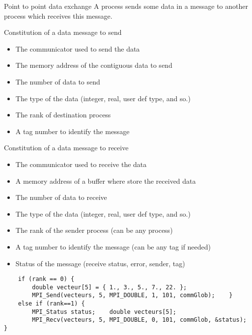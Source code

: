\documentclass[compress,10pt,aspectratio=169]{beamer}
\begin{document}
\begin{frame}[fragile]{Point to point data exchange}
    \scriptsize
    A process sends some data in a message to another process which receives this message.
    \begin{multicols}{2}
    \begin{block}{\small Constitution of a data message to send}
        \begin{itemize}
            \item The communicator used to send the data
            \item The memory address of the contiguous data to send
            \item The number of data to send
            \item The type of the data (integer, real, user def type, and so.)
            \item The rank of destination process
            \item A tag number to identify the message
        \end{itemize}
    \end{block}
    \begin{block}{\small Constitution of a data message to receive}
        \begin{itemize}
            \item The communicator used to receive the data
            \item A memory address of a buffer where store the received data
            \item The number of data to receive
            \item The type of the data (integer, real, user def type, and so.)
            \item The rank of the sender process (can be any process)
            \item A tag number to identify the message (can be any tag if needed)
            \item Status of the message (receive status, error, sender, tag)
        \end{itemize}
    \end{block}
\end{multicols}

\begin{verbatim}
    if (rank == 0) {
        double vecteur[5] = { 1., 3., 5., 7., 22. };
        MPI_Send(vecteurs, 5, MPI_DOUBLE, 1, 101, commGlob);    }
    else if (rank==1) {
        MPI_Status status;    double vecteurs[5];
        MPI_Recv(vecteurs, 5, MPI_DOUBLE, 0, 101, commGlob, &status);    }
\end{verbatim}

\end{frame}
\end{document}
